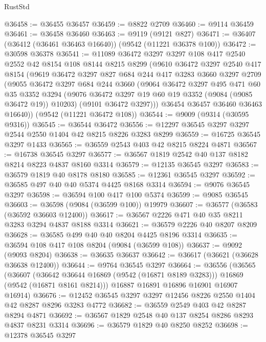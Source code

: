 \begin{lexlean}{RustStd}
\begin{coremodule}
@36458 := @36455 @36457
@36459 := @8822 @2709
@36460 := @9114 @36459
@36461 := @36458 @36460
@36463 := @9119 (@9121 @827)
@36471 := @36407 (@36412 (@36461 @36463 @16640)) (@9542 (@11221 @36378 @100))
@36472 := @30598 @36378
@36541 := @11089
    @36472
    @3297
    @3297
    @108
    @417
    @2540
    @2552
    @42
    @8154
    @108
    @8144
    @8215
    @8299
    (@9610
      @36472
      @3297
      @2540
      @417
      @8154
      (@9619
        @36472
        @3297
        @827
        @684
        @244
        @417
        @3283
        @3660
        @3297
        @2709
        (@9055
          @36472
          @3297
          @684
          @244
          @3660
          (@9064
            @36472
            @3297
            @495
            @471
            @60
            @35
            @3352
            @3294
            (@9076 @36472 @3297 @19 @60 @19 @3352 (@9084 (@9085 @36472 @19)) @10203)
            (@9101 @36472 @3297)))
        @36454
        @36457
        @36460
        @36463
        @16640))
    (@9542 (@11221 @36472 @108))
@36544 := @9009 (@9314 (@30595 @9316))
@36545 := @36544 @36472
@36556 := @12297 @36545 @3297 @3297 @2544 @2550 @1404 @42 @8215 @8226 @3283 @8299
@36559 := @16725 @36545 @3297 @1433
@36565 := @36559 @2543 @403 @42 @8215 @8224 @4871
@36567 := @16738 @36545 @3297
@36577 := @36567 @1819 @2542 @40 @137 @8182 @8214 @8223 @4837 @8160 @3314
@36579 := @12135 @36545 @3297
@36583 := @36579 @1819 @40 @8178 @8180
@36585 := @12361 @36545 @3297
@36592 := @36585 @497 @40 @40 @5374 @4425 @8168 @3314
@36594 := @9076 @36545 @3297
@36598 := @36594 @100 @417 @100 @5374
@36599 := @9085 @36545
@36603 := @36598 (@9084 (@36599 @100)) @19979
@36607 := @36577 (@36583 (@36592 @36603 @12400))
@36617 := @36567 @2226 @471 @40 @35 @8211 @3283 @3294 @4837 @8188 @3314
@36621 := @36579 @2226 @40 @8207 @8209
@36628 := @36585 @499 @40 @40 @8204 @4425 @8196 @3314
@36635 := @36594 @108 @417 @108 @8204 (@9084 (@36599 @108))
@36637 := @9092 (@9093 @8204)
@36638 := @36635 @36637
@36642 := @36617 (@36621 (@36628 @36638 @12400))
@36644 := @9764 @36545 @3297
@36664 := @36556
    (@36565
      (@36607
        (@36642 @36644 @16869 (@9542 (@16871 @8189 @3283)))
        @16869
        (@9542 (@16871 @8161 @8214)))
      @16887
      @16891
      @16896
      @16901
      @16907
      @16914)
@36676 := @12452 @36545 @3297 @3297 @12456 @8226 @2550 @1404 @42 @8287 @8296 @3283 @4772
@36682 := @36559 @2549 @403 @42 @8287 @8294 @4871
@36692 := @36567 @1829 @2548 @40 @137 @8254 @8286 @8293 @4837 @8231 @3314
@36696 := @36579 @1829 @40 @8250 @8252
@36698 := @12378 @36545 @3297

\end{coremodule}
\end{lexlean}
